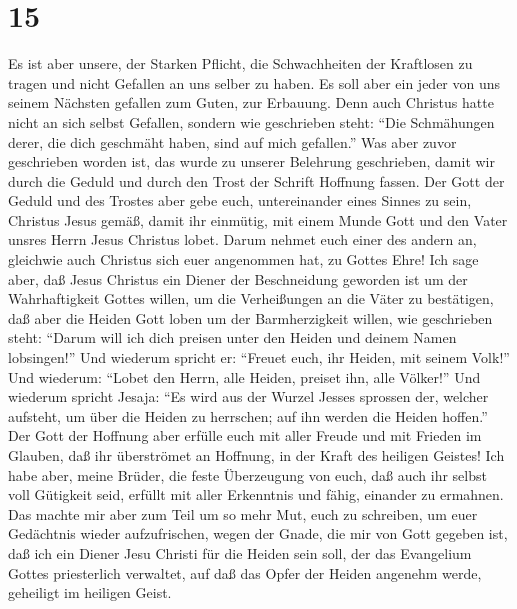 \hypertarget{section-14}{%
\section{15}\label{section-14}}

 Es ist aber unsere, der Starken Pflicht, die
Schwachheiten der Kraftlosen zu tragen und nicht Gefallen an uns selber
zu haben.  Es soll aber ein jeder von uns seinem Nächsten
gefallen zum Guten, zur Erbauung.  Denn auch Christus
hatte nicht an sich selbst Gefallen, sondern wie geschrieben steht:
``Die Schmähungen derer, die dich geschmäht haben, sind auf mich
gefallen.''  Was aber zuvor geschrieben worden ist, das
wurde zu unserer Belehrung geschrieben, damit wir durch die Geduld und
durch den Trost der Schrift Hoffnung fassen.  Der Gott der
Geduld und des Trostes aber gebe euch, untereinander eines Sinnes zu
sein, Christus Jesus gemäß,  damit ihr einmütig, mit einem
Munde Gott und den Vater unsres Herrn Jesus Christus lobet.
 Darum nehmet euch einer des andern an, gleichwie auch
Christus sich euer angenommen hat, zu Gottes Ehre!  Ich
sage aber, daß Jesus Christus ein Diener der Beschneidung geworden ist
um der Wahrhaftigkeit Gottes willen, um die Verheißungen an die Väter zu
bestätigen,  daß aber die Heiden Gott loben um der
Barmherzigkeit willen, wie geschrieben steht: ``Darum will ich dich
preisen unter den Heiden und deinem Namen lobsingen!'' 
Und wiederum spricht er: ``Freuet euch, ihr Heiden, mit seinem Volk!''
 Und wiederum: ``Lobet den Herrn, alle Heiden, preiset
ihn, alle Völker!''  Und wiederum spricht Jesaja: ``Es
wird aus der Wurzel Jesses sprossen der, welcher aufsteht, um über die
Heiden zu herrschen; auf ihn werden die Heiden hoffen.'' 
Der Gott der Hoffnung aber erfülle euch mit aller Freude und mit Frieden
im Glauben, daß ihr überströmet an Hoffnung, in der Kraft des heiligen
Geistes!  Ich habe aber, meine Brüder, die feste
Überzeugung von euch, daß auch ihr selbst voll Gütigkeit seid, erfüllt
mit aller Erkenntnis und fähig, einander zu ermahnen. 
Das machte mir aber zum Teil um so mehr Mut, euch zu schreiben, um euer
Gedächtnis wieder aufzufrischen, wegen der Gnade, die mir von Gott
gegeben ist,  daß ich ein Diener Jesu Christi für die
Heiden sein soll, der das Evangelium Gottes priesterlich verwaltet, auf
daß das Opfer der Heiden angenehm werde, geheiligt im heiligen Geist.
